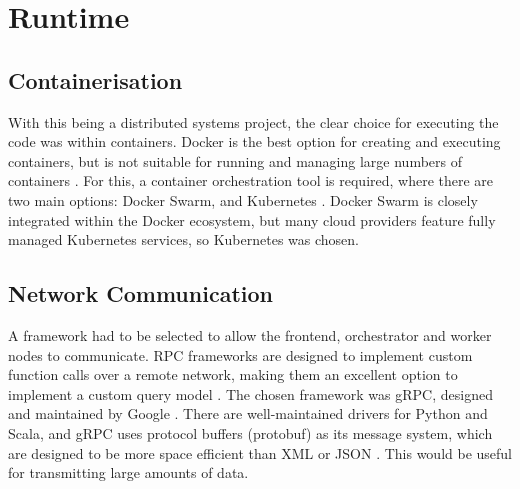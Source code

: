 \section{Runtime}
\subsection{Containerisation}
With this being a distributed systems project, the clear choice for executing the code was within containers. Docker is the best option for creating and executing containers, but is not suitable for running and managing large numbers of containers \cite{orchestrationdockerdocs}. For this, a container orchestration tool is required, where there are two main options: Docker Swarm, and Kubernetes \cite{dockerswarm, k8sapi}. Docker Swarm is closely integrated within the Docker ecosystem, but many cloud providers feature fully managed Kubernetes services, so Kubernetes was chosen.

\subsection{Network Communication} 
A framework had to be selected to allow the frontend, orchestrator and worker nodes to communicate. RPC frameworks are designed to implement custom function calls over a remote network, making them an excellent option to implement a custom query model \cite{srinivasan1995rpc}. The chosen framework was gRPC, designed and maintained by Google \cite{gRPCapi}. There are well-maintained drivers for Python and Scala, and gRPC uses protocol buffers (protobuf) as its message system, which are designed to be more space efficient than XML or JSON \cite{scalapbdocs, protobufdocs}. This would be useful for transmitting large amounts of data. 


